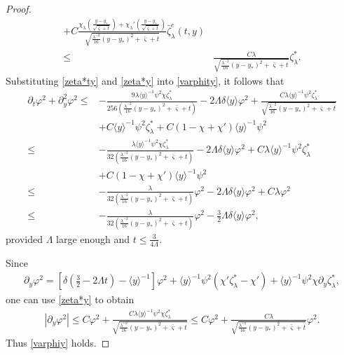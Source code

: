 \documentclass{amsart}
\numberwithin{equation}{section}
\newcommand\y{{{\langle y \rangle}}}
\begin{document}
\begin{proof}
\begin{align}
     +C\frac{\chi_{\lambda}\left(\frac{y-y_{*}}{\sqrt{\bar{\varsigma}+t}}\right)+\chi_{\lambda}'\left(\frac{y-y_{*}}{\sqrt{\bar{\varsigma}+t}}\right)}{\sqrt{\frac{\lambda^{-2}}{16}(y-y_{*})^{2}+\bar{\varsigma}+t}}\bar{\zeta}_{\lambda}^{c}(t,y)\\
\leq&\frac{C\lambda}{\sqrt{\frac{\lambda^{-2}}{16}(y-y_{*})^{2}+\bar{\varsigma}+t}}\zeta_{\lambda}^{*}.\nonumber
\end{align}
Substituting \eqref{zeta*ty} and \eqref{zeta*y} into \eqref{varphity}, it follows that
\begin{align}
\partial_{t}\varphi^{2}+\partial_{y}^{2}\varphi^{2}
\leq&-\frac{9\lambda\y^{-1}\psi^{2}\chi\zeta_{\lambda}^{*}}{256(\frac{\lambda^{-2}}{16}(y-y_{*})^{2}+\bar{\varsigma}+t)}
  -2\Lambda\delta\y\varphi^{2}
  +\frac{C\lambda\y^{-1}\psi^{2}\zeta_{\lambda}^{*}}{\sqrt{\frac{\lambda^{-2}}{16}(y-y_{*})^{2}+\bar{\varsigma}+t}}\\
 &+C\y^{-1}\psi^{2}\zeta_{\lambda}^{*}
  +C(1-\chi+\chi')\y^{-1}\psi^{2}\nonumber\\
\leq&-\frac{\lambda\y^{-1}\psi^{2}\chi\zeta_{\lambda}^{*}}{32(\frac{\lambda^{-2}}{16}(y-y_{*})^{2}+\bar{\varsigma}+t)}
     -2\Lambda\delta\y\varphi^{2}
     +C\lambda\y^{-1}\psi^{2}\zeta_{\lambda}^{*}\nonumber\\
    &+C(1-\chi+\chi')\y^{-1}\psi^{2}\nonumber\\
\leq&-\frac{\lambda}{32(\frac{\lambda^{-2}}{16}(y-y_{*})^{2}+\bar{\varsigma}+t)}\varphi^{2}
     -2\Lambda\delta\y\varphi^{2}
     +C\lambda\varphi^{2}\nonumber\\
\leq&-\frac{\lambda}{32(\frac{\lambda^{-2}}{16}(y-y_{*})^{2}+\bar{\varsigma}+t)}\varphi^{2}
     -\frac{3}{2}\Lambda\delta\y\varphi^{2},\nonumber
\end{align}
provided $\Lambda$ large enough and $t\leq\frac{3}{4\Lambda}$.

Since
\begin{align*}
\partial_{y}\varphi^{2}
=\left[\delta\left(\frac{3}{2}-2\Lambda t\right)-\y^{-1}\right]\varphi^{2}
 +\y^{-1}\psi^{2}(\chi'\zeta_{\lambda}^{*}-\chi')+\y^{-1}\psi^{2}\chi\partial_{y}\zeta_{\lambda}^{*},
\end{align*}
one can use \eqref{zeta*y} to obtain
\begin{align*}
|\partial_{y}\varphi^{2}|
\leq C\varphi^{2}
    +\frac{C\lambda\y^{-1}\psi^{2}\chi\zeta_{\lambda}^{*}}{\sqrt{\frac{\lambda^{-2}}{16}(y-y_{*})^{2}+\bar{\varsigma}+t}}
\leq C\varphi^{2}+\frac{C\lambda}{\sqrt{\frac{\lambda^{-2}}{16}(y-y_{*})^{2}+\bar{\varsigma}+t}}\varphi^{2}.
\end{align*}
Thus \eqref{varphiy} holds.
\end{proof}
\end{document}
